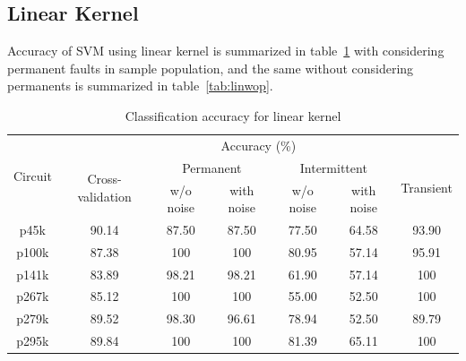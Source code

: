 \subsection{Linear Kernel}
Accuracy of SVM using linear kernel is summarized in table~\ref{tab:linwp} with considering permanent faults in sample population, and the same without considering permanents is summarized in table~\ref{tab:linwop}.
\begin{table}[h]

	\captionsetup{justification=centering}
\begin{tabular}{ccccccc}
\hline
\multicolumn{1}{c}{\multirow{3}{*}{Circuit}} & \multicolumn{6}{c}{Accuracy (\%)}\\ \cline{2-7} 
\multicolumn{1}{c}{}                         & \multicolumn{1}{c}{\multirow{2}{*}{Cross-validation}} & \multicolumn{2}{c}{Permanent} & \multicolumn{2}{c}{Intermittent} & \multicolumn{1}{c}{\multirow{2}{*}{Transient}} \\ \cline{3-6}
                                             &                                                       & w/o noise     & with noise    & w/o noise      & with noise      &                                                \\ \hline
p45k                                         & 90.14                                                 & 87.50         & 87.50         & 77.50          & 64.58           & 93.90                                          \\
p100k                                        & 87.38                                                 & 100           & 100           & 80.95          & 57.14           & 95.91                                          \\
p141k                                        & 83.89                                                 & 98.21         & 98.21         & 61.90          & 57.14           & 100                                            \\
p267k                                        & 85.12                                                 & 100           & 100           & 55.00          & 52.50           & 100                                            \\
p279k                                        & 89.52                                                 & 98.30         & 96.61         & 78.94          & 52.50           & 89.79                                          \\
p295k                                        & 89.84                                                 & 100           & 100           & 81.39          & 65.11           & 100   \\
\hline                                        
\end{tabular}
\caption {Classification accuracy for linear kernel}
\label{tab:linwp}
\end{table}

